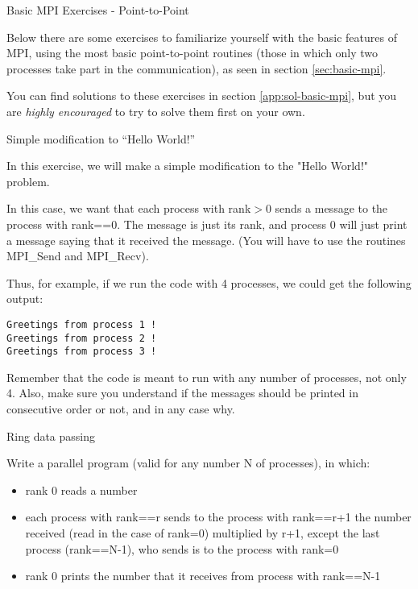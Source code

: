  {Basic MPI Exercises - Point-to-Point}
\label{sec:basic-mpi-exercises}

Below there are some exercises to familiarize yourself with the basic features
of MPI, using the most basic point-to-point routines (those in which only two
processes take part in the communication), as seen in section
\ref{sec:basic-mpi}.

You can find solutions to these exercises in section
\ref{app:sol-basic-mpi}, but you are \emph{highly encouraged} to try to solve
them first on your own.

 {Simple modification to ``Hello World!''}
\label{ex:basic-mpi-modified-hello}

In this exercise, we will make a simple modification to the "Hello World!"
problem. 

In this case, we want that each process with rank$>$0 sends a message to the
process with rank==0. The message is just its rank, and process 0 will just
print a message saying that it received the message. (You will have to use the
routines MPI\_Send and MPI\_Recv).

Thus, for example, if we run the code with 4 processes, we could get the
following output: 

\begin{verbatim}
Greetings from process 1 !
Greetings from process 2 !
Greetings from process 3 !
\end{verbatim}

Remember that the code is meant to run with any number of processes, not only
4. Also, make sure you understand if the messages should be printed in
consecutive order or not, and in any case why.

 {Ring data passing}
\label{ex:basic-mpi-ring}

Write a parallel program (valid for any number N of processes), in which:

\begin{itemize}
\item rank 0 reads a number

\item each process with rank==r sends to the process with rank==r+1 the number
received (read in the case of rank=0) multiplied by r+1, except the last process
(rank==N-1), who sends is to the process with rank=0

\item rank 0 prints the number that it receives from process with rank==N-1

\end{itemize}

